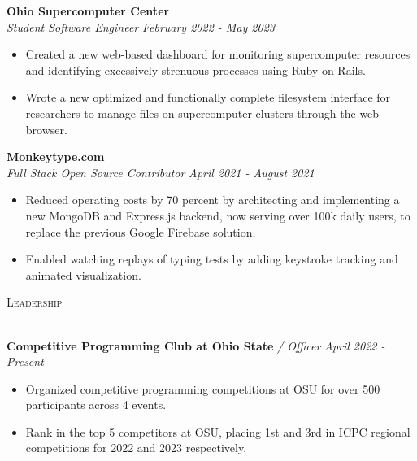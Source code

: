 \documentclass[letterpaper]{article}
\newcommand{\lineunder} {
    \vspace*{-8pt} \\
    \hspace*{-18pt} \hrulefill \\
}
\newcommand{\header} [1] {
    {\hspace*{-18pt}\vspace*{6pt} \textsc{#1}}
    \vspace*{-6pt} \lineunder
}
\begin{document}
    \textbf{Ohio Supercomputer Center}\\
    
    \textit{Student Software Engineer} \hfill \textsl{February 2022 - May 2023}\\
    \vspace{-7pt}
    \begin{itemize} \itemsep -1mm
        
            \item Created a new web-based dashboard for monitoring supercomputer resources and identifying excessively strenuous processes using Ruby on Rails.

            \item Wrote a new optimized and functionally complete filesystem interface for researchers to manage files on supercomputer clusters through the web browser.

    \end{itemize}
    \vspace{-2mm}

    	\textbf{Monkeytype.com}\\
    
    \textit{Full Stack Open Source Contributor} \hfill \textsl{April 2021 - August 2021}\\
    \vspace{-7pt}
    \begin{itemize} \itemsep -1mm
            \item Reduced operating costs by 70 percent by architecting and implementing a new MongoDB and Express.js backend, now serving over 100k daily users, to replace the previous Google Firebase solution.

            \item Enabled watching replays of typing tests by adding keystroke tracking and animated visualization.

    \end{itemize}
    \vspace{-2mm}

\header{Leadership}
\vspace{1mm}

    \textbf{Competitive Programming Club at Ohio State} \textit{/ Officer} \hfill \textsl{April 2022 - Present}\\
    \vspace{-2mm}
    \begin{itemize} \itemsep -1mm
    
        \item Organized competitive programming competitions at OSU for over 500 participants across 4 events.
    
        \item Rank in the top 5 competitors at OSU, placing 1st and 3rd in ICPC regional competitions for 2022 and 2023 respectively.
    
    \end{itemize}
    \vspace{-1mm}
\end{document}
